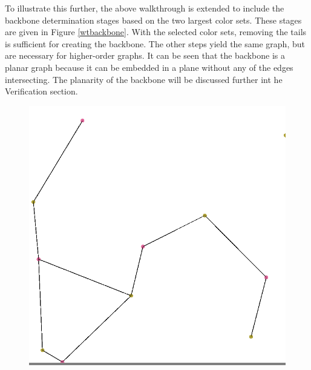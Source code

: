 \documentclass{article}
\begin{document}
        \par
        To illustrate this further, the above walkthrough is extended to include the backbone determination stages based on the two largest color sets. These stages are given in Figure \ref{wtbackbone}. With the selected color sets, removing the tails is sufficient for creating the backbone. The other steps yield the same graph, but are necessary for higher-order graphs. It can be seen that the backbone is a planar graph because it can be embedded in a plane without any of the edges intersecting. The planarity of the backbone will be discussed further int he Verification section.

        \begin{figure}
            \begin{minipage}{0.3\textwidth}
            \colorbox{gray}{\includegraphics[width=\linewidth]{./images/bipartite-wt.png}}
            \end{minipage}
            \hspace{\fill}
            \begin{minipage}{0.3\textwidth}

\end{minipage}
\end{figure}
\end{document}
